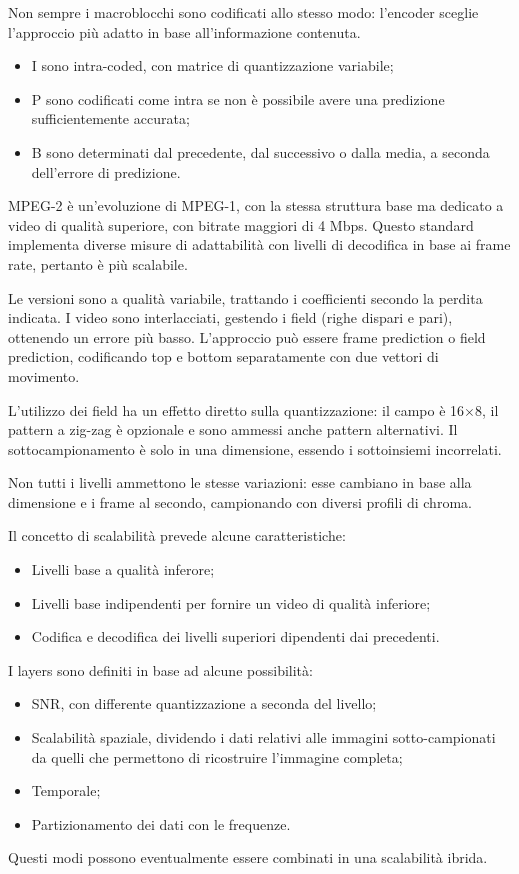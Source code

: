 
Non sempre i macroblocchi sono codificati allo stesso modo: l'encoder sceglie l'approccio più adatto in base all'informazione contenuta.
\begin{itemize}
	\item I sono intra-coded, con matrice di quantizzazione variabile;
	\item P sono codificati come intra se non è possibile avere una predizione sufficientemente accurata;
	\item B sono determinati dal precedente, dal successivo o dalla media, a seconda dell'errore di predizione.
\end{itemize}

MPEG-2 è un'evoluzione di MPEG-1, con la stessa struttura base ma dedicato a video di qualità superiore, con bitrate maggiori di 4 Mbps. Questo standard implementa diverse misure di adattabilità con livelli di decodifica in base ai frame rate, pertanto è più scalabile.

Le versioni sono a qualità variabile, trattando i coefficienti secondo la perdita indicata. I video sono interlacciati, gestendo i field (righe dispari e pari), ottenendo un errore più basso. L'approccio può essere frame prediction o field prediction, codificando top e bottom separatamente con due vettori di movimento.

L'utilizzo dei field ha un effetto diretto sulla quantizzazione: il campo è 16$\times$8, il pattern a zig-zag è opzionale e sono ammessi anche pattern alternativi. Il sottocampionamento è solo in una dimensione, essendo i sottoinsiemi incorrelati. 

Non tutti i livelli ammettono le stesse variazioni: esse cambiano in base alla dimensione e i frame al secondo, campionando con diversi profili di chroma. 

Il concetto di scalabilità prevede alcune caratteristiche:
\begin{itemize}
	\item Livelli base a qualità inferore;
	\item Livelli base indipendenti per fornire un video di qualità inferiore;
	\item Codifica e decodifica dei livelli superiori dipendenti dai precedenti.
\end{itemize}

I layers sono definiti in base ad alcune possibilità:
\begin{itemize}
	\item SNR, con differente quantizzazione a seconda del livello;
	\item Scalabilità spaziale, dividendo i dati relativi alle immagini sotto-campionati da quelli che permettono di ricostruire l'immagine completa;
	\item Temporale;
	\item Partizionamento dei dati con le frequenze.
\end{itemize}
Questi modi possono eventualmente essere combinati in una scalabilità ibrida.

